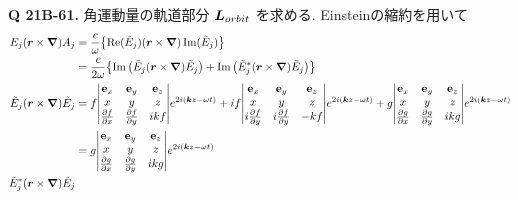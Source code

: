 \documentclass[uplatex,dvipdfmx,a4paper,11pt]{jlreq}
\newcommand{\rr}{\bm{r}}
\newcommand{\kk}{\bm{k}}
\theoremstyle{definition}
\begin{document}
\textbf{Q 21B-61.}
角運動量の軌道部分 $\bm{L}_{orbit}$ を求める. Einsteinの縮約を用いて
\begin{align}
  E_j(\rr\times\vnabla)A_j
                    & = \frac{c}{\omega}\qty{\Re(\Et_j)(\rr\times\vnabla)\Im(\Et_j)}                                                                                                                                                                                                                        \\
                    & = \frac{c}{2\omega}\qty{\Im\qty(\Et_j(\rr\times\vnabla)\Et_j) + \Im\qty(\Et_j^*(\rr\times\vnabla)\Et_j)}                                                                                                                                                                              \\
  \Et_j(\rr\times\vnabla)\Et_j
                    & = f\mqty|\vb{e}_x                                                                                                                                                                                                                                               & \vb{e}_y & \vb{e}_z \\ x & y & z \\ \pdv{f}{x} & \pdv{f}{y} & i kf | e^{2i(\kk z-\omega t)} + i f\mqty|\vb{e}_x                                                                                        & \vb{e}_y & \vb{e}_z \\ x & y & z \\ i\pdv{f}{y} & i\pdv{f}{y} & -kf | e^{2i(\kk z-\omega t)} + g\mqty|\vb{e}_x                                                                                        & \vb{e}_y & \vb{e}_z \\ x & y & z \\ \pdv{g}{x} & \pdv{g}{y} & i kg | e^{2i(\kk z-\omega t)} \\
                    & = g\mqty|\vb{e}_x                                                                                                                                                                                                                                               & \vb{e}_y & \vb{e}_z \\ x & y & z \\ \pdv{g}{x} & \pdv{g}{y} & i kg | e^{2i(\kk z-\omega t)} \\
  \Et_j^*(\rr\times\vnabla)\Et_j

\end{align}
\end{document}
